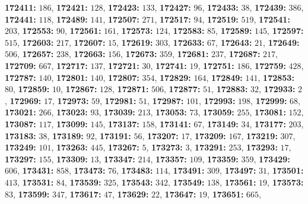 \textsf{\bfseries 172411:} $186$, \textsf{\bfseries 172421:} $128$, \textsf{\bfseries 172423:} $133$, \textsf{\bfseries 172427:} $96$, \textsf{\bfseries 172433:} $38$, \textsf{\bfseries 172439:} $386$, \textsf{\bfseries 172441:} $118$, \textsf{\bfseries 172489:} $141$, \textsf{\bfseries 172507:} $271$, \textsf{\bfseries 172517:} $94$, \textsf{\bfseries 172519:} $519$, \textsf{\bfseries 172541:} $203$, \textsf{\bfseries 172553:} $90$, \textsf{\bfseries 172561:} $161$, \textsf{\bfseries 172573:} $124$, \textsf{\bfseries 172583:} $85$, \textsf{\bfseries 172589:} $145$, \textsf{\bfseries 172597:} $515$, \textsf{\bfseries 172603:} $217$, \textsf{\bfseries 172607:} $15$, \textsf{\bfseries 172619:} $303$, \textsf{\bfseries 172633:} $67$, \textsf{\bfseries 172643:} $21$, \textsf{\bfseries 172649:} $506$, \textsf{\bfseries 172657:} $238$, \textsf{\bfseries 172663:} $156$, \textsf{\bfseries 172673:} $359$, \textsf{\bfseries 172681:} $237$, \textsf{\bfseries 172687:} $217$, \textsf{\bfseries 172709:} $667$, \textsf{\bfseries 172717:} $137$, \textsf{\bfseries 172721:} $30$, \textsf{\bfseries 172741:} $19$, \textsf{\bfseries 172751:} $186$, \textsf{\bfseries 172759:} $428$, \textsf{\bfseries 172787:} $140$, \textsf{\bfseries 172801:} $140$, \textsf{\bfseries 172807:} $354$, \textsf{\bfseries 172829:} $164$, \textsf{\bfseries 172849:} $141$, \textsf{\bfseries 172853:} $80$, \textsf{\bfseries 172859:} $10$, \textsf{\bfseries 172867:} $128$, \textsf{\bfseries 172871:} $506$, \textsf{\bfseries 172877:} $51$, \textsf{\bfseries 172883:} $32$, \textsf{\bfseries 172933:} $2$, \textsf{\bfseries 172969:} $17$, \textsf{\bfseries 172973:} $59$, \textsf{\bfseries 172981:} $51$, \textsf{\bfseries 172987:} $101$, \textsf{\bfseries 172993:} $198$, \textsf{\bfseries 172999:} $68$, \textsf{\bfseries 173021:} $266$, \textsf{\bfseries 173023:} $93$, \textsf{\bfseries 173039:} $213$, \textsf{\bfseries 173053:} $73$, \textsf{\bfseries 173059:} $255$, \textsf{\bfseries 173081:} $152$, \textsf{\bfseries 173087:} $117$, \textsf{\bfseries 173099:} $145$, \textsf{\bfseries 173137:} $158$, \textsf{\bfseries 173141:} $67$, \textsf{\bfseries 173149:} $34$, \textsf{\bfseries 173177:} $203$, \textsf{\bfseries 173183:} $38$, \textsf{\bfseries 173189:} $92$, \textsf{\bfseries 173191:} $56$, \textsf{\bfseries 173207:} $17$, \textsf{\bfseries 173209:} $167$, \textsf{\bfseries 173219:} $307$, \textsf{\bfseries 173249:} $101$, \textsf{\bfseries 173263:} $445$, \textsf{\bfseries 173267:} $5$, \textsf{\bfseries 173273:} $3$, \textsf{\bfseries 173291:} $253$, \textsf{\bfseries 173293:} $17$, \textsf{\bfseries 173297:} $155$, \textsf{\bfseries 173309:} $13$, \textsf{\bfseries 173347:} $214$, \textsf{\bfseries 173357:} $109$, \textsf{\bfseries 173359:} $359$, \textsf{\bfseries 173429:} $606$, \textsf{\bfseries 173431:} $858$, \textsf{\bfseries 173473:} $76$, \textsf{\bfseries 173483:} $114$, \textsf{\bfseries 173491:} $309$, \textsf{\bfseries 173497:} $31$, \textsf{\bfseries 173501:} $413$, \textsf{\bfseries 173531:} $84$, \textsf{\bfseries 173539:} $325$, \textsf{\bfseries 173543:} $342$, \textsf{\bfseries 173549:} $138$, \textsf{\bfseries 173561:} $19$, \textsf{\bfseries 173573:} $83$, \textsf{\bfseries 173599:} $347$, \textsf{\bfseries 173617:} $47$, \textsf{\bfseries 173629:} $22$, \textsf{\bfseries 173647:} $19$, \textsf{\bfseries 173651:} $665$, 
